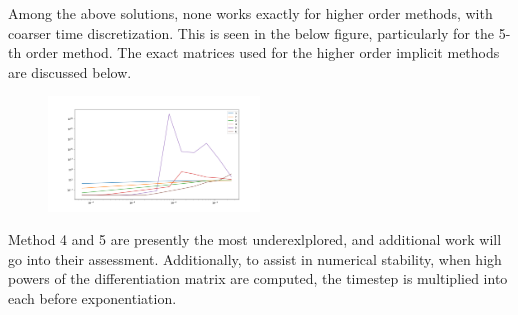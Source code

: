 \documentclass[12pt]{article}
\begin{document}
Among the above solutions, none works exactly for higher order methods, with coarser time discretization.
This is seen in the below figure, particularly for the 5-th order method.
The exact matrices used for the higher order implicit methods are discussed below.
\begin{figure}[H]
	\centering
	\includegraphics[width=0.5\textwidth]{bad_order_rates.png}
\end{figure}
Method 4 and 5 are presently the most underexlplored, and additional work will go into their assessment. 
Additionally, to assist in numerical stability, when high powers of the differentiation matrix are computed, the timestep is multiplied into each before exponentiation.
\end{document}
